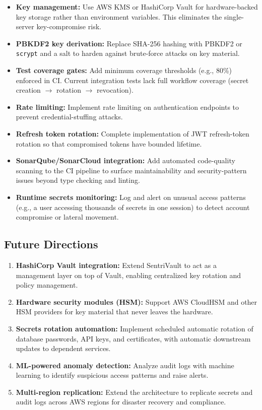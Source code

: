 \documentclass[conference]{IEEEtran}
\begin{document}
\begin{itemize}
  \item \textbf{Key management:} Use AWS KMS or HashiCorp Vault for hardware-backed key storage rather than environment variables. This eliminates the single-server key-compromise risk.
  \item \textbf{PBKDF2 key derivation:} Replace SHA-256 hashing with PBKDF2 or \texttt{scrypt} and a salt to harden against brute-force attacks on key material.
  \item \textbf{Test coverage gates:} Add minimum coverage thresholds (e.g., 80\%) enforced in CI. Current integration tests lack full workflow coverage (secret creation $\to$ rotation $\to$ revocation).
  \item \textbf{Rate limiting:} Implement rate limiting on authentication endpoints to prevent credential-stuffing attacks.
  \item \textbf{Refresh token rotation:} Complete implementation of JWT refresh-token rotation so that compromised tokens have bounded lifetime.
  \item \textbf{SonarQube/SonarCloud integration:} Add automated code-quality scanning to the CI pipeline to surface maintainability and security-pattern issues beyond type checking and linting.
  \item \textbf{Runtime secrets monitoring:} Log and alert on unusual access patterns (e.g., a user accessing thousands of secrets in one session) to detect account compromise or lateral movement.
\end{itemize}

\subsection{Future Directions}

\begin{enumerate}
  \item \textbf{HashiCorp Vault integration:} Extend SentriVault to act as a management layer on top of Vault, enabling centralized key rotation and policy management.
  \item \textbf{Hardware security modules (HSM):} Support AWS CloudHSM and other HSM providers for key material that never leaves the hardware.
  \item \textbf{Secrets rotation automation:} Implement scheduled automatic rotation of database passwords, API keys, and certificates, with automatic downstream updates to dependent services.
  \item \textbf{ML-powered anomaly detection:} Analyze audit logs with machine learning to identify suspicious access patterns and raise alerts.
  \item \textbf{Multi-region replication:} Extend the architecture to replicate secrets and audit logs across AWS regions for disaster recovery and compliance.
\end{enumerate}
\end{document}
